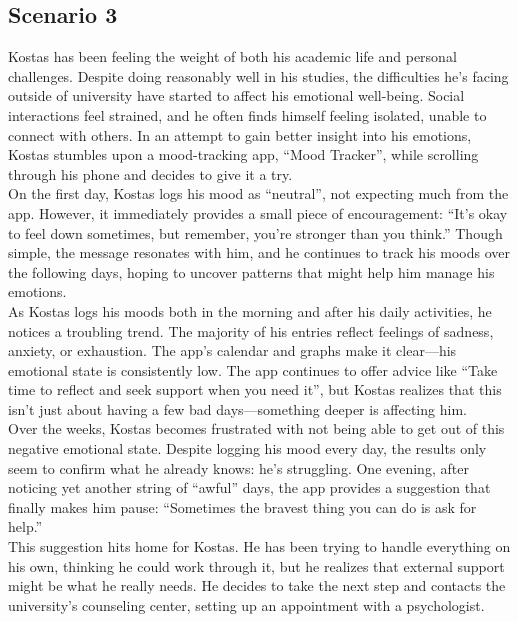 \subsection{Scenario 3}

Kostas has been feeling the weight of both his academic life and personal challenges. Despite doing reasonably well in his studies, the difficulties he's facing outside of university have started to affect his emotional well-being. Social interactions feel strained, and he often finds himself feeling isolated, unable to connect with others. In an attempt to gain better insight into his emotions, Kostas stumbles upon a mood-tracking app, ``Mood Tracker'', while scrolling through his phone and decides to give it a try.\vspace{5mm} \\
On the first day, Kostas logs his mood as ``neutral'', not expecting much from the app. However, it immediately provides a small piece of encouragement: “It’s okay to feel down sometimes, but remember, you’re stronger than you think.” Though simple, the message resonates with him, and he continues to track his moods over the following days, hoping to uncover patterns that might help him manage his emotions.\vspace{5mm} \\
As Kostas logs his moods both in the morning and after his daily activities, he notices a troubling trend. The majority of his entries reflect feelings of sadness, anxiety, or exhaustion. The app's calendar and graphs make it clear—his emotional state is consistently low. The app continues to offer advice like “Take time to reflect and seek support when you need it”, but Kostas realizes that this isn’t just about having a few bad days—something deeper is affecting him.\vspace{5mm} \\
Over the weeks, Kostas becomes frustrated with not being able to get out of this negative emotional state. Despite logging his mood every day, the results only seem to confirm what he already knows: he's struggling. One evening, after noticing yet another string of ``awful'' days, the app provides a suggestion that finally makes him pause: “Sometimes the bravest thing you can do is ask for help.”\vspace{5mm} \\
This suggestion hits home for Kostas. He has been trying to handle everything on his own, thinking he could work through it, but he realizes that external support might be what he really needs. He decides to take the next step and contacts the university’s counseling center, setting up an appointment with a psychologist.\vspace{5mm} \\
